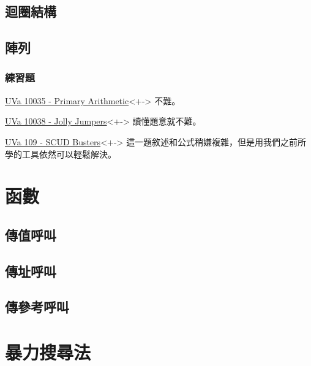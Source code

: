 \documentclass[utf8]{beamer}
\begin{document}
\begin{CJK}{UTF8}{bkai}
\subsection{迴圈結構}
\subsection{陣列}

\begin{frame}
  \frametitle{練習題}
  \begin{exampleblock}{\href{http://unfortunate-dog.github.io/articles/100/p10035/}{UVa 10035 - Primary Arithmetic}}<+->
  \label{uva:10035}
  不難。
  \end{exampleblock}
  \begin{exampleblock}{\href{http://unfortunate-dog.github.io/articles/100/p10038/}{UVa 10038 - Jolly Jumpers}}<+->
  \label{uva:10038}
  讀懂題意就不難。
  \end{exampleblock}
  \begin{exampleblock}{\href{http://unfortunate-dog.github.io/articles/1/p109/}{UVa 109 - SCUD Busters}}<+->
  \label{uva:591}
  這一題敘述和公式稍嫌複雜，但是用我們之前所學的工具依然可以輕鬆解決。
  \end{exampleblock}
\end{frame}

\section{函數}

\subsection{傳值呼叫}

\subsection{傳址呼叫}

\subsection{傳參考呼叫}

\section{暴力搜尋法}

\clearpage
\end{CJK}
\end{document}

